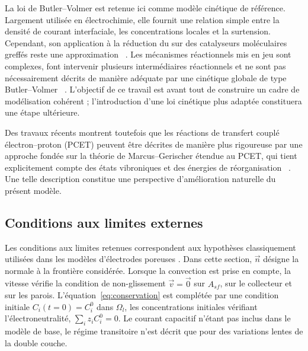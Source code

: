 La loi de Butler--Volmer est retenue ici comme modèle cinétique de
référence. Largement utilisée en électrochimie, elle fournit une
relation simple entre la densité de courant interfaciale, les
concentrations locales et la surtension. Cependant, son application à
la réduction du  sur des catalyseurs moléculaires greffés reste
une approximation%
~\cite{adesinaButlerVolmerEquationCO22024}. Les mécanismes réactionnels
mis en jeu sont complexes, font intervenir plusieurs intermédiaires
réactionnels et ne sont pas nécessairement décrits de manière adéquate
par une cinétique globale de type Butler--Volmer%
~\cite{koperTheoryMultipleProton2013,gottleProtoncoupledElectronTransfer2017}.
L'objectif de ce travail est avant tout de construire un cadre de
modélisation cohérent ; l'introduction d'une loi cinétique plus adaptée
constituera une étape ultérieure.

Des travaux récents montrent toutefois que les réactions de transfert
couplé électron--proton (PCET) peuvent être décrites de manière plus
rigoureuse par une approche fondée sur la théorie de
Marcus--Gerischer étendue au PCET, qui tient explicitement compte des
états vibroniques et des énergies de réorganisation%
~\cite{kessingerReorganizationEnergiesInterfacial2022}.
Une telle description constitue une perspective d'amélioration
naturelle du présent modèle.

\subsection*{Conditions aux limites externes}

Les conditions aux limites retenues correspondent aux hypothèses
classiquement utilisées dans les modèles d'électrodes poreuses
\cite{newmanElectrochemicalSystems,
mendez-vasquezUpscalingMassElectric2025}. Dans cette section, $\vec{n}$ désigne la
normale à la frontière considérée. Lorsque la convection est prise en compte, la vitesse
vérifie la condition de non-glissement $\vec{v} = \vec{0}$ sur $A_{sf}$, sur le collecteur et sur les
parois.  L'équation~\eqref{eq:conservation} est complétée par une condition initiale
$C_i(t=0) = C_i^0$ dans $\Omega_l$, les concentrations initiales vérifiant
l'électroneutralité, $\sum_i z_i C_i^0 = 0$. Le courant capacitif n'étant pas inclus dans le modèle
de base, le régime transitoire n'est décrit que pour des variations lentes de la double
couche.

